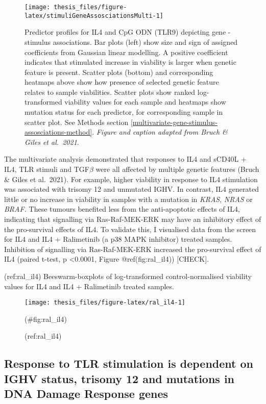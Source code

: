 \documentclass[11pt, a4paper, twosided]{book}
\begin{document}
\begin{figure}

{\centering \texttt{[image: thesis\_files/figure-latex/stimuliGeneAssosciationsMulti-1]} 

}

\caption{Predictor profiles for IL4 and CpG ODN (TLR9) depicting gene - stimulus associations. Bar plots (left) show size and sign of assigned coefficients from Gaussian linear modelling. A positive coefficient indicates that stimulated increase in viability is larger when genetic feature is present. Scatter plots (bottom) and corresponding heatmaps above show how presence of selected genetic feature relates to sample viabilities. Scatter plots show ranked log-transformed viability values for each sample and heatmaps show mutation status for each predictor, for corresponding sample in scatter plot. See Methods section \ref{multivariate-gene-stimulus-assosciations-method}. \emph{Figure and caption adapted from Bruch \& Giles et al.~2021}.}\label{fig:stimuliGeneAssosciationsMulti}
\end{figure}
The multivariate analysis demonstrated that responses to IL4 and sCD40L + IL4, TLR stimuli and TGF\(\beta\) were all affected by multiple genetic features (Bruch \& Giles et al.~2021). For example, higher viability in response to IL4 stimulation was associated with trisomy 12 and unmutated IGHV. In contrast, IL4 generated little or no increase in viability in samples with a mutation in \emph{KRAS}, \emph{NRAS} or \emph{BRAF.} These tumours benefited less from the anti-apoptotic effects of IL4, indicating that signalling via Ras-Raf-MEK-ERK may have an inhibitory effect of the pro-survival effects of IL4. To validate this, I visualised data from the screen for IL4 and IL4 + Ralimetinib (a p38 MAPK inhibitor) treated samples. Inhibition of signalling via Ras-Raf-MEK-ERK increased the pro-survival effect of IL4 (paired t-test, p \textless0.0001, Figure @ref(fig:ral\_il4)) {[}CHECK{]}.

(ref:ral\_il4) Beeswarm-boxplots of log-transformed control-normalised viability values for IL4 and IL4 + Ralimetinib treated samples.
\begin{figure}

{\centering \texttt{[image: thesis\_files/figure-latex/ral\_il4-1]} 

}

\caption{(ref:ral_il4)}(\#fig:ral_il4)
\end{figure}
\hypertarget{response-to-tlr-stimulation-is-dependent-on-ighv-status-trisomy-12-and-mutations-in-dna-damage-response-genes}{%
\subsection{Response to TLR stimulation is dependent on IGHV status, trisomy 12 and mutations in DNA Damage Response genes}\label{response-to-tlr-stimulation-is-dependent-on-ighv-status-trisomy-12-and-mutations-in-dna-damage-response-genes}}
\end{document}
